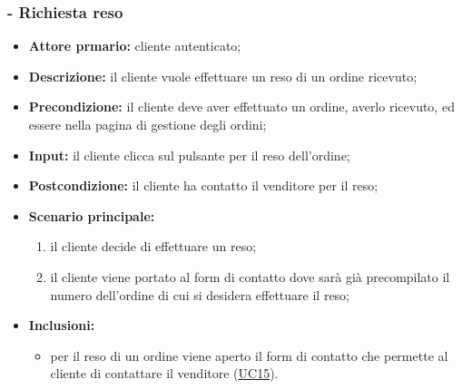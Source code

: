 \subsubsection{ - Richiesta reso}
\begin{itemize}
    \item \textbf{Attore prmario:} cliente autenticato;
    \item \textbf{Descrizione:} il cliente vuole effettuare un reso di un ordine ricevuto;
    \item \textbf{Precondizione:} il cliente deve aver effettuato un ordine, averlo ricevuto, ed essere nella pagina di gestione degli ordini;
    \item \textbf{Input:} il cliente clicca sul pulsante per il reso dell'ordine;
    \item \textbf{Postcondizione:} il cliente ha contatto il venditore per il reso;
    \item \textbf{Scenario principale:}
          \begin{enumerate}
              \item il cliente decide di effettuare un reso;
              \item il cliente viene portato al form di contatto dove sarà già precompilato il numero dell'ordine di cui si desidera effettuare il reso;
          \end{enumerate}
    \item \textbf{Inclusioni:}
          \begin{itemize}
              \item per il reso di un ordine viene aperto il form di contatto che permette al cliente di contattare il venditore (\hyperref[UC15]{UC15}).
          \end{itemize}
\end{itemize}

\stepsubUserCase
